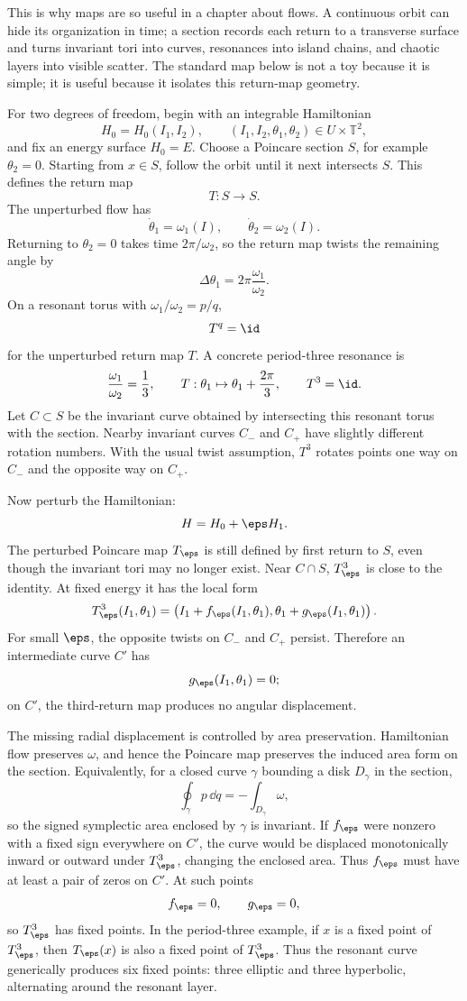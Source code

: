 This is why maps are so useful in a chapter about flows. A continuous orbit can
hide its organization in time; a section records each return to a transverse
surface and turns invariant tori into curves, resonances into island chains,
and chaotic layers into visible scatter. The standard map below is not a toy
because it is simple; it is useful because it isolates this return-map
geometry.

For two degrees of freedom, begin with an integrable Hamiltonian
\[
  H_0=H_0(I_1,I_2),
  \qquad
  (I_1,I_2,\theta_1,\theta_2)\in U\times\mathbb T^2,
\]
and fix an energy surface \(H_0=E\). Choose a Poincare section \(S\), for
example \(\theta_2=0\). Starting from \(x\in S\), follow the orbit until it
next intersects \(S\). This defines the return map
\[
  T:S\to S.
\]
The unperturbed flow has
\[
  \dot\theta_1=\omega_1(I),
  \qquad
  \dot\theta_2=\omega_2(I).
\]
Returning to \(\theta_2=0\) takes time \(2\pi/\omega_2\), so the return map
twists the remaining angle by
\[
  \Delta\theta_1=2\pi\frac{\omega_1}{\omega_2}.
\]
On a resonant torus with \(\omega_1/\omega_2=p/q\),
\[
  T^q=\id
\]
for the unperturbed return map \(T\). A concrete period-three resonance is
\[
  \frac{\omega_1}{\omega_2}=\frac13,
  \qquad
  T:\theta_1\mapsto\theta_1+\frac{2\pi}{3},
  \qquad
  T^3=\id.
\]
Let \(C\subset S\) be the invariant curve obtained by intersecting this
resonant torus with the section. Nearby invariant curves \(C_-\) and \(C_+\)
have slightly different rotation numbers. With the usual twist assumption,
\(T^3\) rotates points one way on \(C_-\) and the opposite way on \(C_+\).

Now perturb the Hamiltonian:
\[
  H=H_0+\eps H_1.
\]
The perturbed Poincare map \(T_\eps\) is still defined by first return to
\(S\), even though the invariant tori may no longer exist. Near
\(C\cap S\), \(T_\eps^3\) is close to the identity. At fixed energy it has the
local form
\[
  T_\eps^3(I_1,\theta_1)
  =
  \left(
    I_1+f_\eps(I_1,\theta_1),
    \theta_1+g_\eps(I_1,\theta_1)
  \right).
\]
For small \(\eps\), the opposite twists on \(C_-\) and \(C_+\) persist.
Therefore an intermediate curve \(C'\) has
\[
  g_\eps(I_1,\theta_1)=0;
\]
on \(C'\), the third-return map produces no angular displacement.

The missing radial displacement is controlled by area preservation. Hamiltonian
flow preserves \(\omega\), and hence the Poincare map preserves the induced
area form on the section. Equivalently, for a closed curve \(\gamma\) bounding
a disk \(D_\gamma\) in the section,
\[
  \oint_\gamma p\,\dd q
  =
  -\int_{D_\gamma}\omega,
\]
so the signed symplectic area enclosed by \(\gamma\) is invariant. If
\(f_\eps\) were nonzero with a fixed sign everywhere on \(C'\), the curve
would be displaced monotonically inward or outward under \(T_\eps^3\), changing
the enclosed area. Thus \(f_\eps\) must have at least a pair of zeros on
\(C'\). At such points
\[
  f_\eps=0,
  \qquad
  g_\eps=0,
\]
so \(T_\eps^3\) has fixed points. In the period-three example, if \(x\) is a
fixed point of \(T_\eps^3\), then \(T_\eps(x)\) is also a fixed point of
\(T_\eps^3\). Thus the resonant curve generically produces six fixed points:
three elliptic and three hyperbolic, alternating around the resonant layer.

